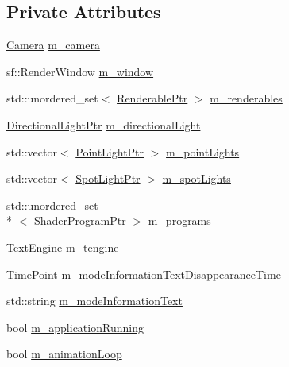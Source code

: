 \subsection*{Private Attributes}
\begin{DoxyCompactItemize}
\item 
\hyperlink{classCamera}{Camera} \hyperlink{classViewer_aca2cfeaed36c2ea6711d694ace109aca}{m\+\_\+camera}
\item 
sf\+::\+Render\+Window \hyperlink{classViewer_a02691cb0b474e4afc22bea4e6154a83f}{m\+\_\+window}
\item 
std\+::unordered\+\_\+set$<$ \hyperlink{Renderable_8hpp_af96923590b8eeb9c51882b39815f266b}{Renderable\+Ptr} $>$ \hyperlink{classViewer_a73ebb9719c2f2ffb9891642503c793cc}{m\+\_\+renderables}
\item 
\hyperlink{Light_8hpp_ad8ef93288a101a8d8f185fb2a88f496d}{Directional\+Light\+Ptr} \hyperlink{classViewer_a0c19f64be563889aa53ce1cdde30e322}{m\+\_\+directional\+Light}
\item 
std\+::vector$<$ \hyperlink{Light_8hpp_a28898b9799350669037caef13c5115d2}{Point\+Light\+Ptr} $>$ \hyperlink{classViewer_a0839a4bd3c220aa6e50d9c3d304e68ee}{m\+\_\+point\+Lights}
\item 
std\+::vector$<$ \hyperlink{Light_8hpp_a1865f598c5eed6e6e1f79d7296852092}{Spot\+Light\+Ptr} $>$ \hyperlink{classViewer_ad241b9648367de46033672b4a759cfd3}{m\+\_\+spot\+Lights}
\item 
std\+::unordered\+\_\+set\\*
$<$ \hyperlink{ShaderProgram_8hpp_af8e4af1ad4c53875ee5d32ab7e1f4966}{Shader\+Program\+Ptr} $>$ \hyperlink{classViewer_ae46d7bb320590c0fabe27e20299a4eec}{m\+\_\+programs}
\item 
\hyperlink{classTextEngine}{Text\+Engine} \hyperlink{classViewer_a502511db306be04271e6469fc2b2d908}{m\+\_\+tengine}
\item 
\hyperlink{classViewer_ae3f3e7a7694a354a2d374693649000ec}{Time\+Point} \hyperlink{classViewer_a36cbb2fc59ec195458a2982d335edc9f}{m\+\_\+mode\+Information\+Text\+Disappearance\+Time}
\item 
std\+::string \hyperlink{classViewer_addd1668ee49c52296c2d13a15d2a8f6c}{m\+\_\+mode\+Information\+Text}
\item 
bool \hyperlink{classViewer_a3172d624cfacccdbc5cc225535429880}{m\+\_\+application\+Running}
\item 
bool \hyperlink{classViewer_a8333976239ee77a66bad2975600ec880}{m\+\_\+animation\+Loop}
\item 

\end{DoxyCompactItemize}
